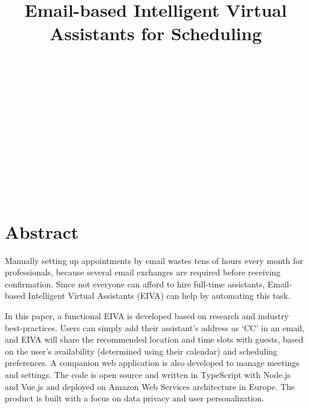 \documentclass{article}
\title{{\titlefont \linespread{1.5} Email-based Intelligent Virtual Assistants for Scheduling}}
\begin{document}

\vspace*{\fill}
\begin{center}
	\\
	\vspace{3mm}
	\\
	\vspace{30mm}
	\\
	\vspace{3mm}
	\\
	\vspace{30mm}
	\\
	\vspace{3mm}
	\\
	\vspace{30mm}
	\\
	\vspace{3mm}
	\coverfont{\today}\\
	\vspace{30mm}
	\\
	\vspace{3mm}
	\\
\end{center}
\vspace*{\fill}

\newpage


\section*{Abstract}

Manually setting up appointments by email wastes tens of hours every month for professionals, because several email exchanges are required before receiving confirmation. Since not everyone can afford to hire full-time assistants, Email-based Intelligent Virtual Assistants (EIVA) can help by automating this task.

In this paper, a functional EIVA is developed based on research and industry best-practices. Users can simply add their assistant's address as `CC' in an email, and EIVA will share the recommended location and time slots with guests, based on the user's availability (determined using their calendar) and scheduling preferences. A companion web application is also developed to manage meetings and settings. The code is open source and written in TypeScript with Node.js and Vue.js and deployed on Amazon Web Services architecture in Europe. The product is built with a focus on data privacy and user personalization.
\end{document}
